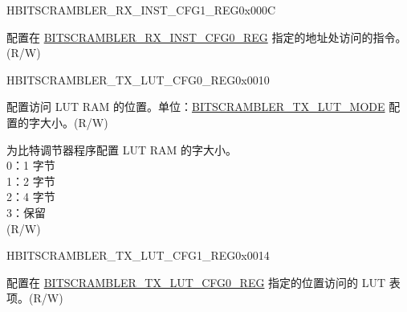 \begin{register}{H}{BITSCRAMBLER\_RX\_INST\_CFG1\_REG}{0x000C}\label{regdesc:BITSCRAMBLERRXINSTCFG1REG}
%
\regnewline%
\begin{regdesc}\begin{reglist}
\label{fielddesc:BITSCRAMBLERRXINST}\item [BITSCRAMBLER\_RX\_INST] 配置在 \hyperref[regdesc:BITSCRAMBLERRXINSTCFG0REG]{BITSCRAMBLER\_RX\_INST\_CFG0\_REG} 指定的地址处访问的指令。 (R/W)
\end{reglist}\end{regdesc}
\end{register}


\begin{register}{H}{BITSCRAMBLER\_TX\_LUT\_CFG0\_REG}{0x0010}\label{regdesc:BITSCRAMBLERTXLUTCFG0REG}
%
%
%
\regnewline%
\begin{regdesc}\begin{reglist}
\label{fielddesc:BITSCRAMBLERTXLUTIDX}\item [BITSCRAMBLER\_TX\_LUT\_IDX] 配置访问 LUT RAM 的位置。单位：\hyperref[fielddesc:BITSCRAMBLERTXLUTMODE]{BITSCRAMBLER\_TX\_LUT\_MODE} 配置的字大小。(R/W)
\label{fielddesc:BITSCRAMBLERTXLUTMODE}\item [BITSCRAMBLER\_TX\_LUT\_MODE] 为比特调节器程序配置 LUT RAM 的字大小。 \\
0：1 字节\\
1：2 字节\\
2：4 字节\\
3：保留 \\
(R/W)
\end{reglist}\end{regdesc}
\end{register}


\begin{register}{H}{BITSCRAMBLER\_TX\_LUT\_CFG1\_REG}{0x0014}\label{regdesc:BITSCRAMBLERTXLUTCFG1REG}
%
\regnewline%
\begin{regdesc}\begin{reglist}
\label{fielddesc:BITSCRAMBLERTXLUT}\item [BITSCRAMBLER\_TX\_LUT] 配置在 \hyperref[regdesc:BITSCRAMBLERTXLUTCFG0REG]{BITSCRAMBLER\_TX\_LUT\_CFG0\_REG} 指定的位置访问的 LUT 表项。(R/W)
\end{reglist}\end{regdesc}
\end{register}


